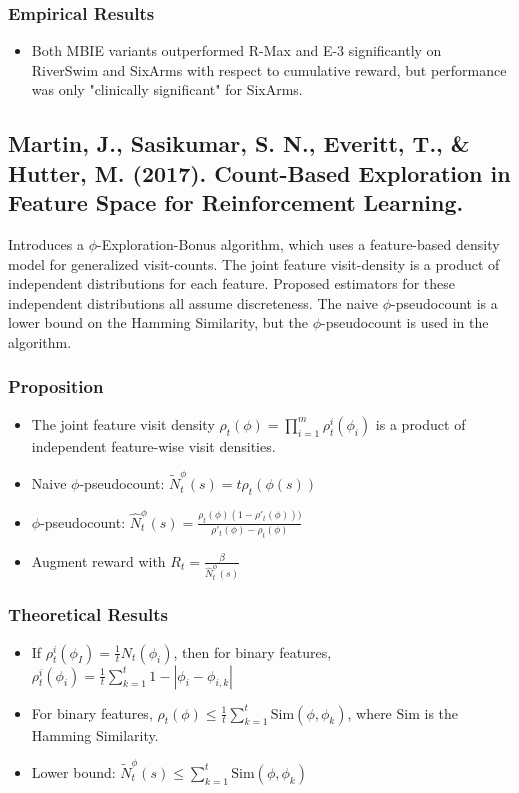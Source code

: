 \documentclass[12pt, oneside]{amsart}
\begin{document}
	\subsubsection*{Empirical Results}
	
	\begin{itemize}
		\item Both MBIE variants outperformed R-Max and E-3 significantly on RiverSwim and SixArms with respect to cumulative reward, but performance was only "clinically significant" for SixArms.
	\end{itemize}
	
	\subsection*{Martin, J., Sasikumar, S. N., Everitt, T., \& Hutter, M.  (2017). Count-Based Exploration in Feature Space for Reinforcement Learning.}
	Introduces a $\phi$-Exploration-Bonus algorithm, which uses a feature-based density model for generalized visit-counts. The joint feature visit-density is a product of independent distributions for each feature. Proposed estimators for these independent distributions all assume discreteness. The naive $\phi$-pseudocount is a lower bound on the Hamming Similarity, but the $\phi$-pseudocount is used in the algorithm.
	
	\subsubsection*{Proposition}
	\begin{itemize}
		\item The joint feature visit density $\rho_t(\phi) = \prod_{i=1}^{m}\rho_t^i(\phi_i)$ is a product of independent feature-wise visit densities.
		\item Naive $\phi$-pseudocount: $\tilde{N}_t^\phi(s) = t\rho_t(\phi(s))$
		\item $\phi$-pseudocount: $\hat{N}_t^\phi(s) = \frac{\rho_t(\phi)(1-\rho'_t(\phi)))}{\rho'_t(\phi) - \rho_t(\phi)}$
		\item Augment reward with $R_t = \frac{\beta}{\hat{N}_t^\phi(s)}$
	\end{itemize}
	
	\subsubsection*{Theoretical Results}
	\begin{itemize}
		\item If $\rho_t^i(\phi_I) = \frac{1}{t}N_t(\phi_i)$, then for binary features, $\rho_t^i(\phi_i) = \frac{1}{t}\sum_{k=1}^{t} 1-|\phi_i- \phi_{i,k}|$
		\item For binary features, $\rho_t(\phi) \leq \frac{1}{t} \sum_{k=1}^{t}\text{Sim}(\phi, \phi_k)$, where $\text{Sim}$ is the Hamming Similarity.
		\item Lower bound: $\tilde{N}_t^\phi(s) \leq \sum_{k=1}^{t}\text{Sim}(\phi, \phi_k)$
	\end{itemize}
\end{document}
